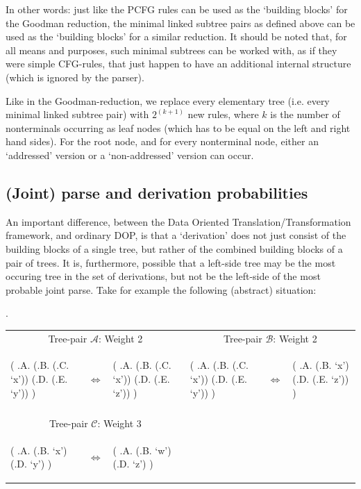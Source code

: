 \documentclass[a4paper]{article}
\theoremstyle{definition}
\begin{document}
In other words: just like the PCFG rules can be used as the `building blocks'
for the Goodman reduction, the minimal linked subtree pairs as defined above
can be used as the `building blocks' for a similar reduction. It should be
noted that, for all means and purposes, such minimal subtrees can be worked
with, as if they were simple CFG-rules, that just happen to have an additional
internal structure (which is ignored by the parser).

Like in the Goodman-reduction, we replace every elementary tree (i.e. every
minimal linked subtree pair) with $2^{(k+1)}$ new rules, where $k$ is the
number of nonterminals occurring as leaf nodes (which has to be equal on the
left and right hand sides). For the root node, and for every nonterminal node,
either an `addressed' version or a `non-addressed' version can occur.

\subsection{(Joint) parse and derivation probabilities}

An important difference, between the Data Oriented Translation/Transformation framework, and ordinary DOP, is that a `derivation' does not just consist of the building blocks of a single tree, but rather of the combined building blocks of a pair of trees. It is, furthermore, possible that a left-side tree may be the most occuring tree in the set of derivations, but not be the left-side of the most probable joint parse. Take for example the following (abstract) situation:

\ex. \label{abstractexample}

\begin{tabular}{llllll}
\multicolumn{3}{c}{Tree-pair $\mathcal{A}$: Weight 2} &
\multicolumn{3}{c}{Tree-pair $\mathcal{B}$: Weight 2} \\
\begin{parsetree}
( .A.
    (.B. (.C. `x'))
    (.D. (.E. `y'))
)
\end{parsetree}
& $\iff$ &
\begin{parsetree}
( .A.
    (.B. (.C. `x'))
    (.D. (.E. `z'))
)
\end{parsetree}
&
\begin{parsetree}
( .A.
    (.B. (.C. `x'))
    (.D. (.E. `y'))
)
\end{parsetree}
& $\iff$ &
\begin{parsetree}
( .A.
    (.B. `x')
    (.D. (.E. `z'))
)
\end{parsetree} \\
& & \\
\multicolumn{3}{c}{Tree-pair $\mathcal{C}$: Weight 3} & \\
\begin{parsetree}
( .A.
    (.B. `x')
    (.D. `y')
)
\end{parsetree}
& $\iff$ &
\begin{parsetree}
( .A.
    (.B. `w')
    (.D. `z')
)
\end{parsetree}

\end{tabular}
\vspace{1em}
\end{document}
